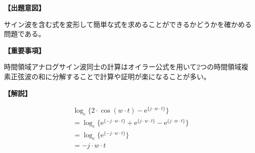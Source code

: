 \noindent \textbf{【出題意図】}

\bigskip
\noindent サイン波を含む式を変形して簡単な式を求めることができるかどうかを確かめる問題である。

\vspace{1em}
\noindent \textbf{【重要事項】}

\medskip
\noindent 時間領域アナログサイン波同士の計算はオイラー公式を用いて2つの時間領域複素正弦波の和に分解することで計算や証明が楽になることが多い。

\bigskip

\vspace{1em}
\noindent \textbf{【解説】}

\bigskip

\begin{align*}
& \log_e \{ 2 \cdot \cos( w \cdot t ) - \textrm{e}^{\{ j \cdot w \cdot t \}} \} \\
& = 
\log_e \{
\textrm{e}^{\{ -j \cdot w \cdot t \}}
+\textrm{e}^{\{ j \cdot w \cdot t \}}
-\textrm{e}^{\{ j \cdot w \cdot t \}}
\} \\
& =
\log_e \{
\textrm{e}^{\{ -j \cdot w \cdot t \}}
\} \\
& =  -j \cdot w \cdot t 
\end{align*}

